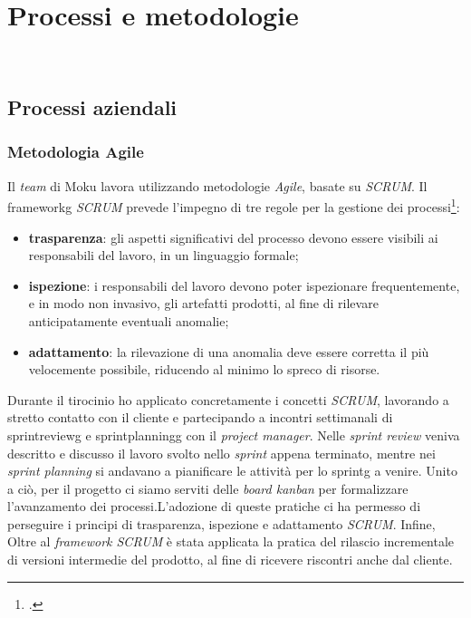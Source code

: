 
\chapter{Processi e metodologie}
\label{cap:cap2}

\\

\section{Processi aziendali}
\subsection{Metodologia Agile}
Il \textit{team} di Moku lavora utilizzando metodologie \textit{Agile}, basate su \textit{SCRUM}. Il \gls{frameworkg} \textit{SCRUM} prevede l'impegno di tre regole per la gestione dei processi\footcite{site:scrum-doc}:
\begin{itemize}
    \item \textbf{trasparenza}: gli aspetti significativi del processo devono essere visibili ai responsabili del lavoro, in un linguaggio formale; 
    \item \textbf{ispezione}: i responsabili del lavoro devono poter ispezionare frequentemente, e in modo non invasivo, gli artefatti prodotti, al fine di rilevare anticipatamente eventuali anomalie; 
    \item \textbf{adattamento}: la rilevazione di una anomalia deve essere corretta il più velocemente possibile, riducendo al minimo lo spreco di risorse.
\end{itemize}
Durante il tirocinio ho applicato concretamente i concetti \textit{SCRUM}, lavorando a stretto contatto con il cliente e  partecipando a incontri settimanali di \gls{sprintreviewg} e \gls{sprintplanningg} con il \textit{project manager}. Nelle \textit{sprint review} veniva descritto e discusso il lavoro svolto nello \textit{sprint} appena terminato, mentre nei \textit{sprint planning} si andavano a pianificare le attività per lo \gls{sprintg} a venire. Unito a ciò, per il progetto ci siamo serviti delle \textit{board kanban} per formalizzare l'avanzamento dei processi.L'adozione di queste pratiche ci ha permesso di perseguire i principi di trasparenza, ispezione e adattamento \textit{SCRUM}. Infine, Oltre al \textit{framework SCRUM} è stata applicata la pratica del rilascio incrementale di versioni intermedie del prodotto, al fine di ricevere riscontri anche dal cliente.


